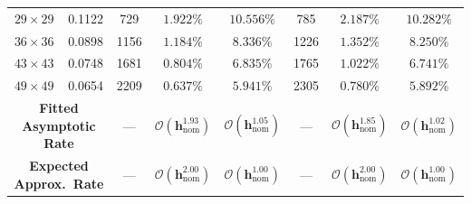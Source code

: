 \documentclass[VANCOUVER]{USG}
\begin{document}
\begin{table}[!t]
{\begin{tabular}{cc|ccc|ccc}
            $29 \times 29$                                       & 0.1122                                       & 729                                                  & $1.922\%$                                                           & $10.556\%$                                          & 785                                                 & $2.187\%$                                           & $10.282\%$                                          \\
            $36 \times 36$                                       & 0.0898                                       & 1156                                                 & $1.184\%$                                                           & $8.336\%$                                           & 1226                                                & $1.352\%$                                           & $8.250\%$                                           \\
            $43 \times 43$                                       & 0.0748                                       & 1681                                                 & $0.804\%$                                                           & $6.835\%$                                           & 1765                                                & $1.022\%$                                           & $6.741\%$                                           \\
            $49 \times 49$                                       & 0.0654                                       & 2209                                                 & $0.637\%$                                                           & $5.941\%$                                           & 2305                                                & $0.780\%$                                           & $5.892\%$                                           \\
            \midrule
            \multicolumn{2}{c|}{\textbf{Fitted Asymptotic Rate}} & ---                                          & $\boldsymbol{\mathcal{O}(h_{\mathrm{nom}}^{1.93})}$  & $\boldsymbol{\mathcal{O}(h_{\mathrm{nom}}^{1.05})}$                 & ---                                                 & $\boldsymbol{\mathcal{O}(h_{\mathrm{nom}}^{1.85})}$ & $\boldsymbol{\mathcal{O}(h_{\mathrm{nom}}^{1.02})}$ \\
            \multicolumn{2}{c|}{\textbf{Expected Approx.\ Rate}} & ---                                          & $\boldsymbol{\mathcal{O}(h_{\mathrm{nom}}^{2.00})}$  & $\boldsymbol{\mathcal{O}(h_{\mathrm{nom}}^{1.00})}$                 & ---                                                 & $\boldsymbol{\mathcal{O}(h_{\mathrm{nom}}^{2.00})}$ & $\boldsymbol{\mathcal{O}(h_{\mathrm{nom}}^{1.00})}$ \\
            \bottomrule
        \end{tabular}
    }
\end{table}
\end{document}
